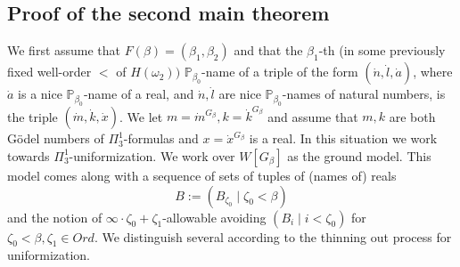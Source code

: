 \documentclass[a4paper,11pt]{article}
\newcommand{\forceP}{\mathbb{P}}
\begin{document}
\subsection{Proof of the second main theorem}
  We first assume that $F(\beta)= (\beta_1,\beta_2) $ and that the $\beta_1$-th (in some previously fixed well-order $<$ of $H(\omega_2))$ $\forceP_{\beta_0}$-name of a triple of the form $(\dot{n}, \dot{l}, \dot{a})$, where $\dot{a}$ is a nice $\forceP_{\beta_0}$-name of a real, and $\dot{n}, \dot{l}$ are nice $\forceP_{\beta_0}$-names of natural numbers, is the triple $(\dot{m},\dot{k},\dot{x})$. We let $m = \dot{m}^{G_{\beta}}, k = \dot{k}^{G_{\beta}}$ and assume that $m,k$ are both G\"odel numbers of $\Pi^1_3$-formulas and $x= \dot{x}^{G_{\beta}}$ is a real. In this situation we work towards $\Pi^1_3$-uniformization. We work over $W[G_{\beta}]$ as the ground model.
This model comes along with a sequence of sets of tuples of (names of) reals
\[ B:= (B_{\zeta_0} \mid  \zeta_0 < \beta)  \]
and  the notion of $\infty \cdot \zeta_0+ \zeta_1$-allowable avoiding $(B_i \mid i < \zeta_0)$ for $\zeta_0 < \beta, \zeta_1\in Ord$.
   We distinguish several according to the thinning out process for uniformization.
\end{document}
